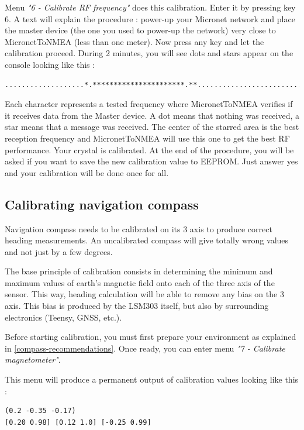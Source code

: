 \documentclass{report}
\begin{document}
Menu \emph{"6 - Calibrate RF frequency"} does this calibration. Enter it by pressing key 6. A text will explain the procedure : power-up your Micronet network and place the master device (the one you used to power-up the network) very close to MicronetToNMEA (less than one meter). Now press any key and let the calibration proceed. During 2 minutes, you will see dots and stars appear on the console looking like this :

\begin{verbatim}
...................*.**********************.**.....................................
\end{verbatim}

Each character represents a tested frequency where MicronetToNMEA verifies if it receives data from the Master device. A dot means that nothing was received, a star means that a message was received. The center of the starred area is the best reception frequency and MicronetToNMEA will use this one to get the best RF performance. Your crystal is calibrated.
At the end of the procedure, you will be asked if you want to save the new calibration value to EEPROM. Just answer yes and your calibration will be done once for all.

\subsection{Calibrating navigation compass}

Navigation compass needs to be calibrated on its 3 axis to produce correct heading measurements. An uncalibrated compass will give totally wrong values and not just by a few degrees.

The base principle of calibration consists in determining the minimum and maximum values of earth's magnetic field onto each of the three axis of the sensor. This way, heading calculation will be able to remove any bias on the 3 axis. This bias is produced by the LSM303 itself, but also by surrounding electronics (Teensy, GNSS, etc.).

Before starting calibration, you must first prepare your environment as explained in \ref{compass-recommendations}. Once ready, you can enter menu \emph{"7 - Calibrate magnetometer"}.

This menu will produce a permanent output of calibration values looking like this :

\begin{verbatim}
(0.2 -0.35 -0.17)
[0.20 0.98] [0.12 1.0] [-0.25 0.99]
\end{verbatim}
\end{document}
